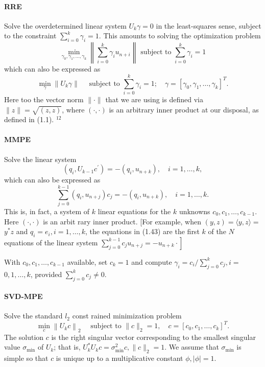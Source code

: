 \paragraph{RRE}

Solve the overdetermined linear system \(U_{k} \gamma=0\) in the least-squares sense, subject to the constraint \(\sum_{i=0}^{k} \gamma_{i}=1\). This amounts to solving the optimization problem
\[
\min _{\gamma_{0}, \gamma_{1}, \ldots, \gamma_{k}}\left\|\sum_{i=0}^{k} \gamma_{i} u_{n+i}\right\| \text { subject to } \sum_{i=0}^{k} \gamma_{i}=1
\]
which can also be expressed as
\[
\min _{\gamma}\left\|U_{k} \gamma\right\| \quad \text { subject to } \sum_{i=0}^{k} \gamma_{i}=1 ; \quad \gamma=\left[\gamma_{0}, \gamma_{1}, \ldots, \gamma_{k}\right]^{T} .
\]
Here too the vector norm \(\|\cdot\|\) that we are using is defined via \(\|z\|=\sqrt{(z, z)}\), where \((\cdot, \cdot)\) is an arbitrary inner product at our disposal, as defined in (1.1). \({ }^{12}\)

\paragraph{MMPE}

Solve the linear system
\[
\left(q_{i}, U_{k-1} c^{\prime}\right)=-\left(q_{i}, u_{n+k}\right), \quad i=1, \ldots, k,
\]
which can also be expressed as
\[
\sum_{j=0}^{k-1}\left(q_{i}, u_{n+j}\right) c_{j}=-\left(q_{i}, u_{n+k}\right), \quad i=1, \ldots, k .
\]
This is, in fact, a system of \(k\) linear equations for the \(k\) unknowns \(c_{0}, c_{1}, \ldots, c_{k-1}\). Here \((\cdot, \cdot)\) is an arbit rary inner product. [For example, when \((y, z)=\langle y, z\rangle=\) \(y^{*} z\) and \(q_{i}=e_{i}, i=1, \ldots, k\), the equations in (1.43) are the first \(k\) of the \(N\) equations of the linear system \(\left.\sum_{j=0}^{k-1} c_{j} u_{n+j}=-u_{n+k} \cdot\right]\)

With \(c_{0}, c_{1}, \ldots, c_{k-1}\) available, set \(c_{k}=1\) and compute \(\gamma_{i}=c_{i} / \sum_{j=0}^{k} c_{j}, i=\) \(0,1, \ldots, k\), provided \(\sum_{j=0}^{k} c_{j} \neq 0\).

\paragraph{SVD-MPE}

Solve the standard \(l_{2}\) const rained minimization problem
\[
\min _{c}\left\|U_{k} c\right\|_{2} \quad \text { subject to }\|c\|_{2}=1, \quad c=\left[c_{0}, c_{1}, \ldots, c_{k}\right]^{T} .
\]
The solution \(c\) is the right singular vector corresponding to the smallest singular value \(\sigma_{\min }\) of \(U_{k}\); that is, \(U_{k}^{*} U_{k} c=\sigma_{\min }^{2} c,\|c\|_{2}=1\). We assume that \(\sigma_{\min }\) is simple so that \(c\) is unique up to a multiplicative constant \(\phi,|\phi|=1\).

